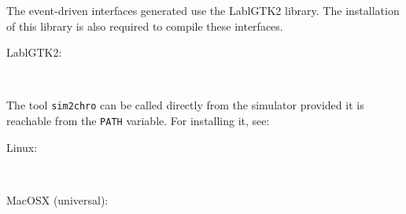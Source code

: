 \documentclass[11pt,titlepage,twoside]{report}
\begin{document}
The event-driven interfaces generated use the LablGTK2 library. The
installation of this library is also required to compile these
interfaces.
\begin{description}
\item[LablGTK2:] \-\\
\end{description}

The tool \verb-sim2chro- can be called directly from the simulator
provided it is reachable from the \verb-PATH- variable. For
installing it, see:

\begin{description}
\item[Linux:] \-\\
\item[MacOSX (universal):] \- \\
\\
\end{description}



\end{document}
